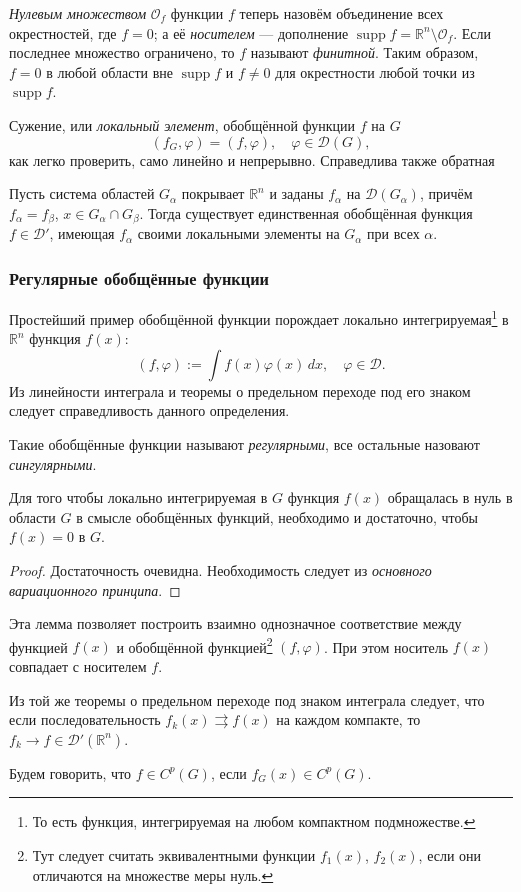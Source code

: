 \emph{Нулевым множеством} $ \mathcal O_f $ функции $ f $ теперь назовём объединение всех окрестностей, где $ f
= 0$; а её \emph{носителем} --- дополнение $ \operatorname{supp} f = \mathbb R^n
\setminus\mathcal O_f$. Если последнее множество ограничено, то $ f $ называют
\emph{финитной}. Таким образом, $ f = 0 $ в любой области вне $ \operatorname{supp} f $
и $ f\neq 0 $ для окрестности любой точки из $ \operatorname{supp}f $.

Сужение, или \emph{локальный элемент}, обобщённой функции $ f $ на $ G $  
\[
  (f_G, \varphi) = (f, \varphi), \quad \varphi \in\mathcal D(G),
\]
как легко проверить, само линейно и непрерывно. Справедлива также обратная
\begin{theorem}
  Пусть система областей $ G_\alpha $ покрывает $ \mathbb R^n $ и заданы $
  f_\alpha $ на $ \mathcal D(G_\alpha) $, причём $ f_\alpha = f_\beta $, $ x \in
  G_\alpha \cap G_\beta$. Тогда существует единственная обобщённая функция $ f
  \in\mathcal D' $, имеющая $ f_\alpha $ своими локальными элементы на $
  G_\alpha $ при всех $ \alpha $.
\end{theorem}

\subsubsection{Регулярные обобщённые функции}
Простейший пример обобщённой функции порождает локально
интегрируемая\footnote{То есть функция, интегрируемая на
любом компактном подмножестве.} в $ \mathbb R^n
$ функция $ f(x) $: 
\[
  (f,\varphi) := \int f(x)\varphi(x)\,dx, \quad \varphi \in \mathcal D.
\]
Из линейности интеграла и теоремы о предельном переходе под его знаком следует
справедливость данного определения.

Такие обобщённые функции называют \emph{регулярными}, все остальные назовают
\emph{сингулярными}.

\begin{theorem}
  Для того чтобы локально интегрируемая в $ G $ функция $ f(x) $ обращалась в
  нуль в области $ G $ в смысле обобщённых функций, необходимо и достаточно,
  чтобы $ f(x) = 0 $ в $ G $.
\end{theorem}
\begin{proof} Достаточность очевидна. Необходимость следует из \emph{основного
  вариационного принципа}.
\end{proof}
Эта лемма позволяет построить взаимно однозначное соответствие между функцией $
f(x)$ и обобщённой функцией\footnote{Тут следует считать эквивалентными функции
$ f_1(x) $, $ f_2(x) $, если они отличаются на множестве меры нуль.} $ (f, \varphi) $. При этом носитель $ f(x) $
совпадает с носителем $ f $.

Из той же теоремы о предельном переходе под знаком интеграла следует, что если
последовательность $ f_k(x) \rightrightarrows f(x)$ на каждом компакте, то $ f_k \to f \in
\mathcal D'(\mathbb R^n) $.

Будем говорить, что $ f \in C^p(G) $, если $ f_G(x) \in C^p(G) $.

